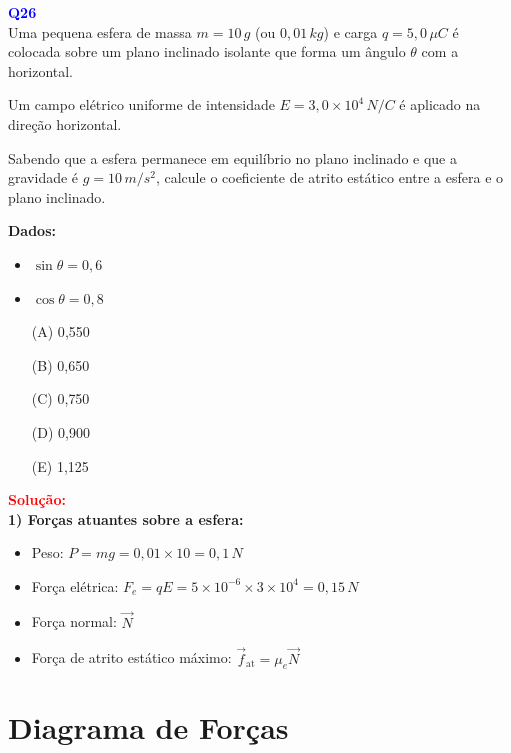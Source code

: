 \documentclass[a4paper,12pt]{article}
\begin{document}
\begin{flushleft}
\textbf{\textcolor{blue}{\Large Q26}}\\

Uma pequena esfera de massa $m = 10\,g$ (ou $0{,}01\,kg$) e carga $q = 5,0\,\mu C$ é colocada sobre um plano inclinado isolante 
que forma um ângulo $\theta$ com a horizontal. 

Um campo elétrico uniforme de intensidade $E = 3,0 \times 10^4\,N/C$ é aplicado na direção horizontal.

Sabendo que a esfera permanece em equilíbrio no plano inclinado e que a gravidade é $g = 10\,m/s^2$, calcule o coeficiente de atrito 
estático entre a esfera e o plano inclinado.

\textbf{Dados:}

\begin{itemize}
\item $\sin\theta = 0{,}6$
\item $\cos\theta = 0{,}8$
\end{itemize}

\begin{itemize}
\item[(A)] 0{,}550
\item[(B)] 0{,}650  
\item[(C)] 0{,}750
\item[(D)] 0{,}900
\item[(E)] 1,125
\end{itemize}

\vspace{0.5cm}

\textcolor{red}{\textbf{Solução:}}\\

\textbf{1) Forças atuantes sobre a esfera:}

\begin{itemize}
\item Peso: $P = mg = 0{,}01 \times 10 = 0{,}1\,N$
\item Força elétrica: $F_e = qE = 5 \times 10^{-6} \times 3 \times 10^4 = 0{,}15\,N$
\item Força normal: $\vec{N}$
\item Força de atrito estático máximo: $\vec{f}_{\text{at}} = \mu_e \vec{N}$
\end{itemize}

\section*{Diagrama de Forças}


\end{flushleft}
\end{document}
